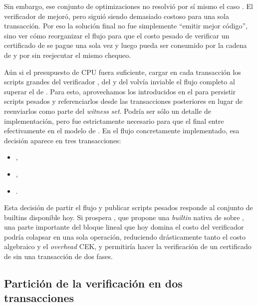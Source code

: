 Sin embargo, ese conjunto de optimizaciones no resolvió por sí mismo el caso \MidnightSTMCircuit. El verificador de \Mithril mejoró, pero siguió siendo demasiado costoso para una sola transacción. Por eso la solución final no fue simplemente ``emitir mejor código'', sino ver cómo reorganizar el flujo para que el costo pesado de verificar un certificado de \Mithril se pague una sola vez y luego pueda ser consumido por la cadena de \StakeDistribution y por \MintTx sin reejecutar el mismo chequeo.

Aún si el presupuesto de CPU fuera suficiente, cargar en cada transacción los scripts grandes del verificador \STM, del \TxsUpdaterMintingValidator y del \MintingValidator volvía inviable el flujo completo al superar el \maxTxSize de \Cardano. Para esto, aprovechamos los \ReferenceScripts introducidos en el  \cite{CIP0033} para persistir scripts pesados \Onchain y referenciarlos desde las transacciones posteriores en lugar de reenviarlos como parte del \textit{witness set}. Podría ser sólo un detalle de implementación, pero fue estrictamente necesario para que el \zkBridge final entre efectivamente en el modelo \eUTxO de \Cardano. En el flujo concretamente implementado, esa decisión aparece en tres transacciones:
\begin{itemize}[noitemsep]
    \item \PublishPhaseOneReferenceScriptTx,
    \item \PublishMintingTxsUpdaterSpendReferenceScriptTx,
    \item \PublishBridgeMintingReferenceScriptTx.
\end{itemize}

Esta decisión de partir el flujo y publicar scripts pesados responde al conjunto de builtins disponible hoy. Si prospera , que propone una \textit{builtin} nativa de \MSM sobre \BLS \cite{CIP0133, PlutusMSMBenchRepo}, una parte importante del bloque lineal que hoy domina el costo del verificador podría colapsar en una sola operación, reduciendo drásticamente tanto el costo algebraico y el \textit{overhead} CEK, y permitiría hacer la verificación de un certificado de \Mithril sin una transacción de dos fases.

\subsection{Partición de la verificación en dos transacciones}
\label{subsec:mithril-a-cardano-particion-de-la-verificacion-en-dos-transacciones}

